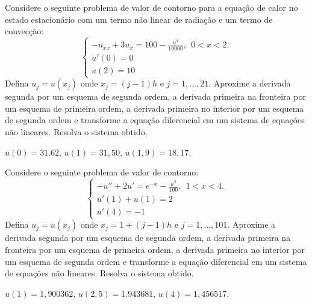 \begin{exer} Considere o seguinte problema de valor de contorno para a equação de calor no estado estacionário com um termo não linear de radiação e um termo de convecção:
$$\left\{\begin{array}{l}-u_{xx}+3u_x=100- \frac{u^4}{10000},~~ 0<x<2.\\
u'(0)=0\\
u(2)=10\end{array}
\right.
$$
Defina $u_j=u(x_j)$ onde $x_j={(j-1)}{h}$ e $j=1,\ldots,21$. Aproxime a derivada segunda por um esquema de segunda ordem, a derivada primeira na fronteira por um esquema de primeira ordem, a derivada primeira no interior por um esquema de segunda ordem e transforme a equação diferencial em um sistema de equações não lineares. Resolva o sistema  obtido.
\end{exer}
\begin{resp}
$u(0)=31.62$, $u(1)=31,50$, $u(1,9)=18,17$.    
\end{resp}

\begin{exer} Considere o seguinte problema de valor de contorno:
$$\left\{\begin{array}{l}-u''+2u'=e^{-x}- \frac{u^2}{100},~~ 1<x<4.\\
u'(1)+u(1)=2\\
u'(4)=-1\end{array}
\right.
$$
Defina $u_j=u(x_j)$ onde $x_j=1+{(j-1)}{h}$ e $j=1,\ldots,101$. Aproxime a derivada segunda por um esquema de segunda ordem, a derivada primeira na fronteira por um esquema de primeira ordem, a derivada primeira no interior por um esquema de segunda ordem e transforme a equação diferencial em um sistema de equações não lineares. Resolva o sistema  obtido.
\end{exer}
\begin{resp}
$u(1)=1,900362$, $u(2,5)=1.943681$, $u(4)=1,456517$.    
\end{resp}

% 